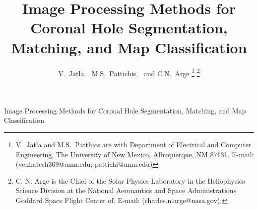 \documentclass[journal]{IEEEtran}
\begin{document}
%
\title{Image Processing Methods for Coronal Hole Segmentation, Matching, 
	and Map Classification}
%
%
%
\author{V.~Jatla,~
	M.S.~Pattichis,~      
	and C.N.~Arge
	\thanks{V.~Jatla and M.S.~Patthics are with Department of 
		Electrical and Computer Engineering,
		The University of New Mexico, Albuquerque, NM 87131. 
		E-mail: (venkatesh369@unm.edu; pattichi@unm.edu)}
	\thanks{C. N. Arge is the Chief of the Solar Physics Laboratory in the Heliophysics Science 
		Division at the National Aeronautics and Space Administration\textquotesingle s Goddard Space Flight 
		Center of. E-mail: (charles.n.arge@nasa.gov).}
}%


%
{Image Processing Methods for Coronal Hole Segmentation, Matching, 
        and Map Classification}
% 


\end{document}
